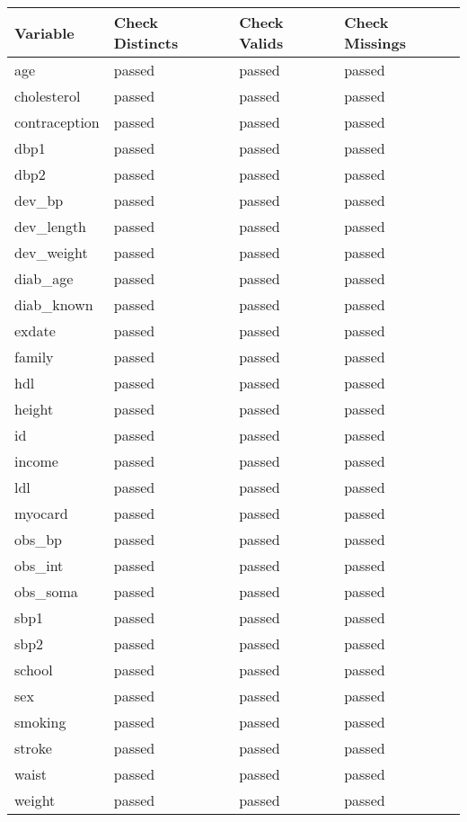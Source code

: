 \documentclass[
]{article}
\begin{document}
\begin{table}[H]
\centering
\begin{tabular}{l|l|l|l}
\hline
\textbf{Variable} & \textbf{Check Distincts} & \textbf{Check Valids} & \textbf{Check Missings}\\
\hline
age & passed & passed & passed\\
\hline
cholesterol & passed & passed & passed\\
\hline
contraception & passed & passed & passed\\
\hline
dbp1 & passed & passed & passed\\
\hline
dbp2 & passed & passed & passed\\
\hline
dev\_bp & passed & passed & passed\\
\hline
dev\_length & passed & passed & passed\\
\hline
dev\_weight & passed & passed & passed\\
\hline
diab\_age & passed & passed & passed\\
\hline
diab\_known & passed & passed & passed\\
\hline
exdate & passed & passed & passed\\
\hline
family & passed & passed & passed\\
\hline
hdl & passed & passed & passed\\
\hline
height & passed & passed & passed\\
\hline
id & passed & passed & passed\\
\hline
income & passed & passed & passed\\
\hline
ldl & passed & passed & passed\\
\hline
myocard & passed & passed & passed\\
\hline
obs\_bp & passed & passed & passed\\
\hline
obs\_int & passed & passed & passed\\
\hline
obs\_soma & passed & passed & passed\\
\hline
sbp1 & passed & passed & passed\\
\hline
sbp2 & passed & passed & passed\\
\hline
school & passed & passed & passed\\
\hline
sex & passed & passed & passed\\
\hline
smoking & passed & passed & passed\\
\hline
stroke & passed & passed & passed\\
\hline
waist & passed & passed & passed\\
\hline
weight & passed & passed & passed\\
\hline
\end{tabular}
\end{table}
\end{document}
